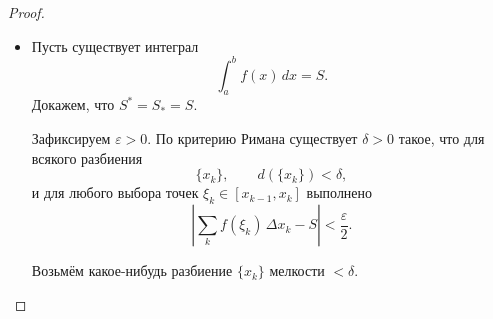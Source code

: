 \documentclass[12pt]{article}
\begin{document}
\begin{proof}
\begin{itemize}
            Для любого выбора отмеченных точек $\xi_j \in [w_{j-1},w_j]$ имеем
            \[
                \underline S_{\{w_j\}}
                \le \sum_j f(\xi_j)\,\Delta w_j
                \le \overline S_{\{w_j\}}.
            \]
            Кроме того,
            \[
                \underline S_{\{w_j\}}
                \le \underline S_{\{\widetilde w_j\}}
                \le \overline S_{\{\widetilde w_j\}}
                \le \overline S_{\{w_j\}}.
            \]
            Так как $\{\widetilde w_j\}$ является измельчением разбиения $\{x_k\}$, то
            \[
                \overline S_{\{\widetilde w_j\}} - \underline S_{\{\widetilde w_j\}}
                \le
                \overline S_{\{x_k\}} - \underline S_{\{x_k\}}
                < 2\varepsilon.
            \]
            Отсюда
            \[
                S-\varepsilon < \underline S_{\{x_k\}}
                \le \underline S_{\{\widetilde w_j\}}
                \le \sum_j f(\xi_j)\,\Delta w_j
                \le \overline S_{\{\widetilde w_j\}}
                \le \overline S_{\{x_k\}} < S+\varepsilon,
            \]
            то есть
            \[
                \left|\sum_j f(\xi_j)\,\Delta w_j - S\right| < \varepsilon.
            \]
            
            Значит, по критерию Римана функция $f$ интегрируема на $[a,b]$, и
            \[
                \int_a^b f(x)\,dx = S.
            \]
            
            \item[$\Leftarrow$]
            
            Пусть существует интеграл
            \[
                \int_a^b f(x)\,dx = S.
            \]
            Докажем, что $S^* = S_* = S$.
            
            Зафиксируем $\varepsilon > 0$. По критерию Римана существует $\delta > 0$ такое, что для всякого разбиения
            \[
                \{x_k\}, \qquad d(\{x_k\}) < \delta,
            \]
            и для любого выбора точек $\xi_k \in [x_{k-1},x_k]$ выполнено
            \[
                \left|\sum_k f(\xi_k)\,\Delta x_k - S\right| < \frac{\varepsilon}{2}.
            \]
            
            Возьмём какое-нибудь разбиение $\{x_k\}$ мелкости $<\delta$.
            

\end{itemize}
\end{proof}
\end{document}
